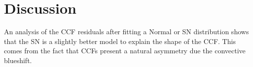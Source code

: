 \documentclass[11pt, oneside]{article}
\begin{document}
{%


\section{Discussion} \label{sec:discu}

An analysis of the CCF residuals after fitting a Normal or SN distribution shows that the SN is a slightly better model to explain the shape of the CCF. This comes from the fact that CCFs present a natural asymmetry due the convective blueshift.

}
\end{document}
